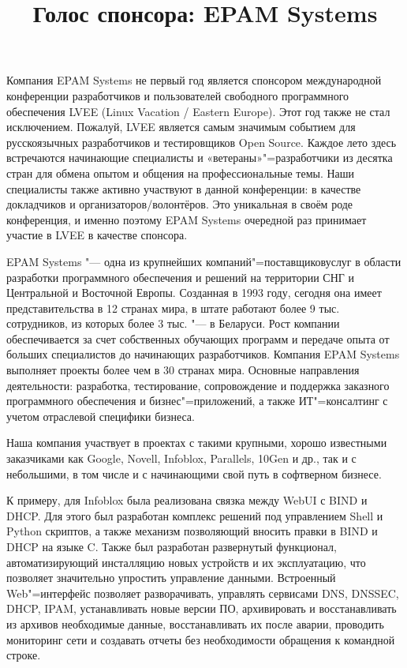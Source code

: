 \documentclass[10pt, a5paper]{article}
\begin{document}
\title{Голос спонсора: EPAM Systems}
\date{}
\maketitle

Компания EPAM Systems не первый год является спонсором международной конференции разработчиков и пользователей свободного программного обеспечения LVEE (Linux Vacation / Eastern Europe). Этот год также не стал исключением. Пожалуй, LVEE является самым значимым событием для русскоязычных разработчиков и тестировщиков Open Source. Каждое лето здесь встречаются начинающие специалисты и «ветераны»"=разработчики из десятка стран для обмена опытом и общения на профессиональные темы. Наши специалисты также активно участвуют в данной конференции: в качестве докладчиков и организаторов/волонтёров. Это уникальная в своём роде конференция, и именно поэтому EPAM Systems очередной раз принимает участие в LVEE в качестве спонсора.


EPAM Systems "--- одна из крупнейших компаний"=поставщиков\linebreak услуг в области разработки программного обеспечения и решений на территории СНГ и Центральной и Восточной Европы. Созданная в 1993 году, сегодня она имеет представительства в 12 странах мира, в штате работают более 9 тыс. сотрудников, из которых более 3 тыс. "--- в Беларуси. Рост компании обеспечивается за счет собственных обучающих программ и передаче опыта от больших специалистов до начинающих разработчиков. Компания EPAM Systems выполняет проекты более чем в 30 странах мира. Основные направления деятельности: разработка, тестирование, сопровождение и поддержка заказного программного обеспечения и бизнес"=приложений, а также ИТ"=консалтинг с учетом отраслевой специфики бизнеса.

Наша компания участвует в проектах с такими крупными, хорошо известными заказчиками как Google, Novell, Infoblox, Parallels, 10Gen и др., так и с небольшими, в том числе и с начинающими свой путь в софтверном бизнесе.


К примеру, для Infoblox была реализована связка между WebUI с BIND и DHCP. Для этого был разработан комплекс решений под управлением Shell и Python скриптов, а также механизм позволяющий вносить правки в BIND и DHCP на языке C. Также был разработан развернутый функционал, автоматизирующий инсталляцию новых устройств и их эксплуатацию, что позволяет значительно упростить управление данными. Встроенный Web"=интерфейс позволяет разворачивать, управлять сервисами DNS, DNSSEC, DHCP, IPAM, устанавливать новые версии ПО, архивировать и восстанавливать из архивов необходимые данные, восстанавливать их после аварии, проводить мониторинг сети и создавать отчеты без необходимости обращения к командной строке.
\end{document}

